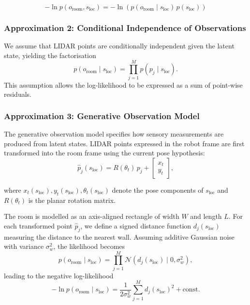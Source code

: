 \documentclass[a4paper, twoside]{article}
\begin{document}
\begin{equation}
    -\ln p(o_{\text{room}}, s_{\text{loc}}) = - \ln{ (p(o_{\text{room}} \mid s_{\text{loc}})\,p(s_{\text{loc}}))}
\end{equation}


\subsubsection{Approximation 2: Conditional Independence of Observations}
\label{sec:room-independence}

We assume that LIDAR points are conditionally independent given the latent state,
yielding the factorisation
\begin{equation}
p(o_{\text{room}} \mid s_{\text{loc}})
=
\prod_{j=1}^M p(p_j \mid s_{\text{loc}}).
\end{equation}
This assumption allows the log-likelihood to be expressed as a sum of
point-wise residuals.

\subsubsection{Approximation 3: Generative Observation Model}
\label{sec:room-generative}

The generative observation model specifies how sensory measurements are produced
from latent states. LIDAR points expressed in the robot frame are first
transformed into the room frame using the current pose hypothesis:
\begin{equation}
    \hat{p}_j(s_{\text{loc}})
    =
    R(\theta_t)\,p_j
    +
    \begin{bmatrix}
    x_t \\ y_t
    \end{bmatrix},
\end{equation}

where $x_t(s_{\text{loc}}), y_t(s_{\text{loc}}), \theta_t(s_{\text{loc}})$ denote the pose components of $s_{\text{loc}}$ and $R(\theta_t)$ is the planar rotation matrix.


The room is modelled as an axis-aligned rectangle of width $W$ and length $L$.
For each transformed point $\hat{p}_j$, we define a signed distance function
$d_j(s_{\text{loc}})$ measuring the distance to the nearest wall. Assuming
additive Gaussian noise with variance $\sigma_w^2$, the likelihood becomes
\begin{equation}
p(o_{\text{room}} \mid s_{\text{loc}})
=
\prod_{j=1}^M
\mathcal{N}\!\left(d_j(s_{\text{loc}})\mid 0, \sigma_w^2\right),
\end{equation}
leading to the negative log-likelihood
\begin{equation}
-\ln p(o_{\text{room}} \mid s_{\text{loc}})
=
\frac{1}{2\sigma_w^2}\sum_{j=1}^M d_j(s_{\text{loc}})^2 + \text{const}.
\end{equation}
\end{document}
